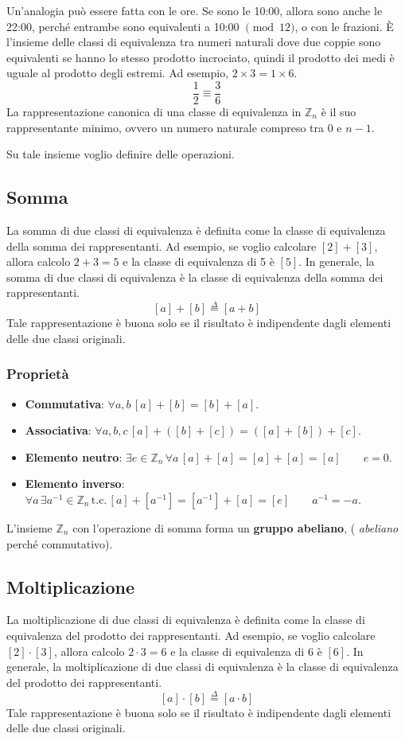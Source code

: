 Un'analogia può essere fatta con le ore. Se sono le 10:00, allora sono anche le 22:00,
perché entrambe sono equivalenti a 10:00 $\pmod{12}$, o con le frazioni. È l'insieme 
delle classi di equivalenza tra numeri naturali dove due coppie sono 
equivalenti se hanno lo stesso prodotto incrociato, quindi il prodotto 
dei medi è uguale al prodotto degli estremi. Ad esempio, $2 \times 3 = 1 \times 6$. 
\[
  \frac{1}{2} \equiv \frac{3}{6}
\]
La rappresentazione canonica di una classe di equivalenza in $\mathbb{Z}_n$ è il suo
rappresentante minimo, ovvero un numero naturale compreso tra 0 e $n-1$.

Su tale insieme voglio definire delle operazioni.
\subsection{Somma}
La somma di due classi di equivalenza è definita come la classe di
equivalenza della somma dei rappresentanti. Ad esempio, se voglio
calcolare $[2] + [3]$, allora calcolo $2 + 3 = 5$ e la classe di equivalenza
di 5 è $[5]$. In generale, la somma di due classi di equivalenza è la classe
di equivalenza della somma dei rappresentanti.
\[
  [a] + [b] \stackrel{\Delta}{=} [a + b]
\]
Tale rappresentazione è buona solo se il risultato è indipendente dagli elementi 
delle due classi originali.
\subsubsection{Proprietà}
\begin{itemize}
  \item \textbf{Commutativa}: $\forall a, b \,[a] + [b] = [b] + [a]$.
  \item \textbf{Associativa}: $\forall a, b, c \,[a] + ([b] + [c]) = ([a] + [b]) + [c]$.
  \item \textbf{Elemento neutro}: $\exists e \in \mathbb{Z}_n \, \forall a \, [a] + [a] = [a] + [a] = [a]\qquad e = 0$.
  \item \textbf{Elemento inverso}: $\forall a \, \exists a^{-1} \in \mathbb{Z}_n \,
  \text{t.c.} \, [a] + [a^{-1}] = [a^{-1}] + [a] = [e] \qquad a^{-1} = -a$.
\end{itemize}
L'insieme $\mathbb{Z}_n$ con l'operazione di somma forma un \textbf{gruppo abeliano}, (
\textit{abeliano} perché commutativo).
\subsection{Moltiplicazione}
La moltiplicazione di due classi di equivalenza è definita come la classe di
equivalenza del prodotto dei rappresentanti. Ad esempio, se voglio
calcolare $[2] \cdot [3]$, allora calcolo $2 \cdot 3 = 6$ e la classe di equivalenza
di 6 è $[6]$. In generale, la moltiplicazione di due classi di equivalenza è la classe
di equivalenza del prodotto dei rappresentanti.
\[
  [a] \cdot [b] \stackrel{\Delta}{=} [a \cdot b]
\]
Tale rappresentazione è buona solo se il risultato è indipendente dagli elementi
delle due classi originali.
